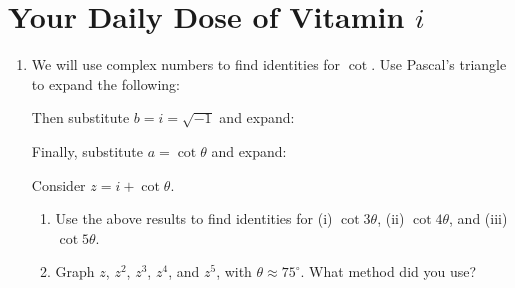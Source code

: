\documentclass[../textbook.tex]{subfiles}
\begin{document}
\section{Your Daily Dose of Vitamin $i$}


\begin{enumerate}
\item We will use complex numbers to find identities for $\cot$. Use Pascal's triangle to expand the following:
\begin{enumerate}
\end{enumerate}
Then substitute $b=i=\sqrt{-1}$ and expand:
\begin{enumerate}
\end{enumerate}
Finally, substitute $a=\cot \theta$ and expand:
\begin{enumerate}
\end{enumerate}
Consider $z=i+\cot\theta$.
\begin{enumerate}
\setcounter{enumii}{\value{vit_i_problem_ii}}
\item Use the above results to find identities for (i) $\cot 3\theta$, (ii) $\cot 4\theta$, and (iii) $\cot 5\theta$. %
\item Graph $z$, $z^2$, $z^3$, $z^4$, and $z^5$, with $\theta \approx 75^\circ$. What method did you use? %
\end{enumerate}


\end{enumerate}
\end{document}
